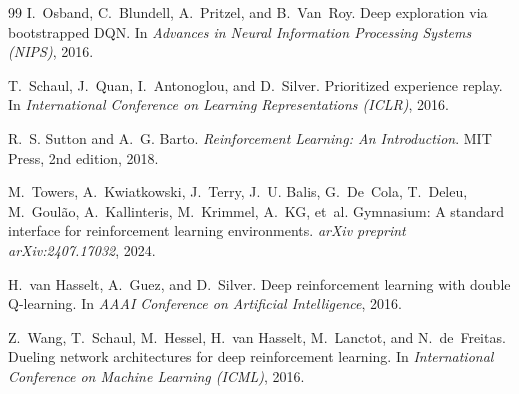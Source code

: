 \documentclass[11pt,a4paper]{article}
\begin{document}
\begin{thebibliography}{99}
I.~Osband, C.~Blundell, A.~Pritzel, and B.~Van~Roy.
\newblock Deep exploration via bootstrapped DQN.
\newblock In \emph{Advances in Neural Information Processing Systems (NIPS)}, 2016.

T.~Schaul, J.~Quan, I.~Antonoglou, and D.~Silver.
\newblock Prioritized experience replay.
\newblock In \emph{International Conference on Learning Representations (ICLR)}, 2016.

R.~S. Sutton and A.~G. Barto.
\newblock \emph{Reinforcement Learning: An Introduction}.
\newblock MIT Press, 2nd edition, 2018.

M.~Towers, A.~Kwiatkowski, J.~Terry, J.~U. Balis, G.~De~Cola, T.~Deleu,
  M.~Goul\~{a}o, A.~Kallinteris, M.~Krimmel, A.~KG, et~al.
\newblock Gymnasium: A standard interface for reinforcement learning
  environments.
\newblock \emph{arXiv preprint arXiv:2407.17032}, 2024.

H.~van Hasselt, A.~Guez, and D.~Silver.
\newblock Deep reinforcement learning with double Q-learning.
\newblock In \emph{AAAI Conference on Artificial Intelligence}, 2016.

Z.~Wang, T.~Schaul, M.~Hessel, H.~van Hasselt, M.~Lanctot, and N.~de~Freitas.
\newblock Dueling network architectures for deep reinforcement learning.
\newblock In \emph{International Conference on Machine Learning (ICML)}, 2016.

\end{thebibliography}
\end{document}
